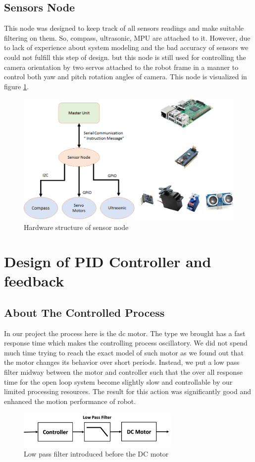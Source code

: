 \documentclass[12pt]{article}
\newcommand\blankpage{%
	\null
	\thispagestyle{empty}%
	\addtocounter{page}{-1}%
	\newpage}
\begin{document}
\subsection{Sensors Node}
	This node was designed to keep track of all sensors readings and make suitable filtering on them. So, compass, ultrasonic, MPU are attached to it. However, due to lack of experience about system modeling and the bad accuracy of sensors we could not fulfill this step of design. but this node is still used for controlling the camera orientation by two servos attached to the robot frame in a manner to control both yaw and pitch rotation angles of camera.
	This node is visualized in figure \ref{fig:sensor-node}.
	\begin{figure}[H]
		\centering
		\includegraphics[width =1\textwidth]{Fig/sensor-node.png}
		\caption{Hardware structure of sensor node}
		\label{fig:sensor-node}
	\end{figure}

\afterpage{\blankpage}
\newpage

\section{Design of PID Controller and feedback}
	\subsection{About The Controlled Process}
	In our project the process here is the dc motor. The type we brought has a fast response time which makes the controlling process oscillatory. We did not spend much time trying to reach the exact model of such motor as we found out that the motor changes its behavior over short periods. Instead, we put a low pass filter midway between the motor and controller such that the over all response time for the open loop system become slightly slow and controllable by our limited processing resources. The result for this action was significantly good and enhanced the motion performance of robot.  
	\begin{figure}[H]
		\centering
		\includegraphics[width =0.7\textwidth]{Fig/lpf.png}
		\caption{Low pass filter introduced before the DC motor}
		\label{fig:lpf}
	\end{figure}
\end{document}
